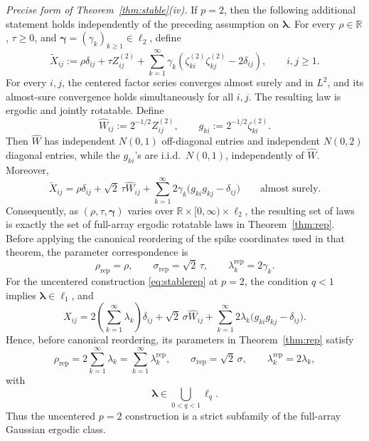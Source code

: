 \emph{Precise form of Theorem~\ref{thm:stable}(iv).}
If \(p=2\), then the following additional statement holds
independently of the preceding assumption on
\(\boldsymbol\lambda\). For every \(\rho\in\mathbb R\),
\(\tau\geq0\), and
\(\boldsymbol\gamma=(\gamma_k)_{k\geq1}\in\ell_2\), define
\begin{equation}
\label{eq:stable-gaussian-centered}
\widetilde X_{ij}
:=
\rho\delta_{ij}
+\tau Z^{(2)}_{ij}
+\sum_{k=1}^{\infty}
 \gamma_k
 \left(
  \zeta^{(2)}_{ki}\zeta^{(2)}_{kj}
  -2\delta_{ij}
 \right),
\qquad i,j\geq1.
\end{equation}
For every \(i,j\), the centered factor series converges almost surely
and in \(L^2\), and its almost-sure convergence holds simultaneously
for all \(i,j\). The resulting law is ergodic and jointly rotatable.
Define
\[
\widehat W_{ij}
:=
2^{-1/2}Z^{(2)}_{ij},
\qquad
g_{ki}
:=
2^{-1/2}\zeta^{(2)}_{ki}.
\]
Then \(\widehat W\) has independent \(N(0,1)\) off-diagonal entries
and independent \(N(0,2)\) diagonal entries, while the \(g_{ki}\)'s
are i.i.d.\ \(N(0,1)\), independently of \(\widehat W\). Moreover,
\begin{equation}
\label{eq:stable-gaussian-reparam}
\widetilde X_{ij}
=
\rho\delta_{ij}
+\sqrt2\,\tau\widehat W_{ij}
+\sum_{k=1}^{\infty}
 2\gamma_k
 \bigl(g_{ki}g_{kj}-\delta_{ij}\bigr)
\qquad\text{almost surely}.
\end{equation}
Consequently, as
\((\rho,\tau,\boldsymbol\gamma)\) varies over
\(\mathbb R\times[0,\infty)\times\ell_2\), the resulting set of laws
is exactly the set of full-array ergodic rotatable laws in
Theorem~\ref{thm:rep}. Before applying the canonical reordering of
the spike coordinates used in that theorem, the parameter
correspondence is
\[
\rho_{\mathrm{rep}}=\rho,
\qquad
\sigma_{\mathrm{rep}}=\sqrt2\,\tau,
\qquad
\lambda_k^{\mathrm{rep}}=2\gamma_k.
\]
For the uncentered construction \eqref{eq:stablerep} at \(p=2\), the
condition \(q<1\) implies
\(\boldsymbol\lambda\in\ell_1\), and
\begin{equation}
\label{eq:uncentered-gaussian-subclass}
X_{ij}
=
2\left(\sum_{k=1}^{\infty}\lambda_k\right)\delta_{ij}
+\sqrt2\,\sigma\widehat W_{ij}
+\sum_{k=1}^{\infty}
 2\lambda_k
 \bigl(g_{ki}g_{kj}-\delta_{ij}\bigr).
\end{equation}
Hence, before canonical reordering, its parameters in
Theorem~\ref{thm:rep} satisfy
\[
\rho_{\mathrm{rep}}
=
2\sum_{k=1}^{\infty}\lambda_k
=
\sum_{k=1}^{\infty}\lambda_k^{\mathrm{rep}},
\qquad
\sigma_{\mathrm{rep}}
=
\sqrt2\,\sigma,
\qquad
\lambda_k^{\mathrm{rep}}
=
2\lambda_k,
\]
with
\[
\boldsymbol\lambda
\in
\bigcup_{0<q<1}\ell_q.
\]
Thus the uncentered \(p=2\) construction is a strict subfamily of the
full-array Gaussian ergodic class.

